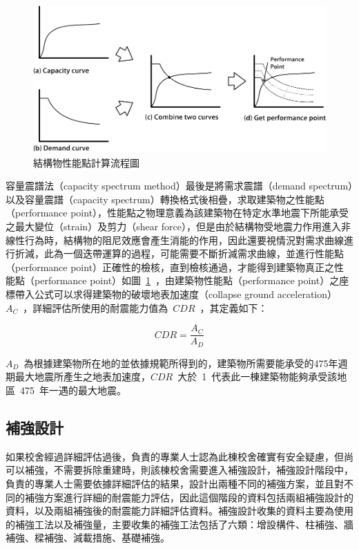 \begin{figure}[hbtp]
  \begin{center}
    \includegraphics[width=1.0\textwidth]{figures/performance-point.png}
    \caption{結構物性能點計算流程圖}
    \label{fig:performance-point}
  \end{center}
\end{figure}

容量震譜法（capacity spectrum method）最後是將需求震譜（demand spectrum）以及容量震譜（capacity spectrum）轉換格式後相疊，求取建築物之性能點（performance point），性能點之物理意義為該建築物在特定水準地震下所能承受之最大變位（strain）及剪力（shear force），但是由於結構物受地震力作用進入非線性行為時，結構物的阻尼效應會產生消能的作用，因此還要視情況對需求曲線進行折減，此為一個迭帶運算的過程，可能需要不斷折減需求曲線，並進行性能點（performance point）正確性的檢核，直到檢核通過，才能得到建築物真正之性能點（performance point）如圖~\ref{fig:performance-point}~，由建築物性能點（performance point）之座標帶入公式可以求得建築物的破壞地表加速度（collapse ground acceleration）~$A_C$~，詳細評估所使用的耐震能力值為~$CDR$~，其定義如下：


\begin{equation} CDR = \dfrac{A_C}{A_D} \label{eq:CDR}\end{equation} 

$A_D$~為根據建築物所在地的並依據規範所得到的，建築物所需要能承受的475年週期最大地震所產生之地表加速度，$CDR$~大於~1~代表此一棟建築物能夠承受該地區~475~年一遇的最大地震。

\subsection{補強設計}

如果校舍經過詳細評估過後，負責的專業人士認為此棟校舍確實有安全疑慮，但尚可以補強，不需要拆除重建時，則該棟校舍需要進入補強設計，補強設計階段中，負責的專業人士需要依據詳細評估的結果，設計出兩種不同的補強方案，並且對不同的補強方案進行詳細的耐震能力評估，因此這個階段的資料包括兩組補強設計的資料，以及兩組補強後的耐震能力詳細評估資料。補強設計收集的資料主要為使用的補強工法以及補強量，主要收集的補強工法包括了六類：增設構件、柱補強、牆補強、樑補強、減載措施、基礎補強。

